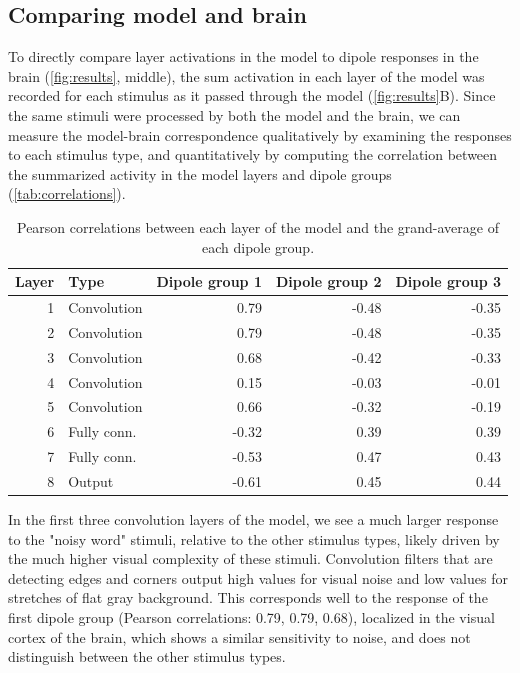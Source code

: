 \documentclass[a4paper, 10pt]{vanvliet_paper}
\begin{document}
\subsection{Comparing model and brain}

To directly compare layer activations in the model to dipole responses in the brain (\autoref{fig:results}, middle), the sum activation in each layer of the model was recorded for each stimulus as it passed through the model (\autoref{fig:results}B).
Since the same stimuli were processed by both the model and the brain, we can measure the model-brain correspondence qualitatively by examining the responses to each stimulus type, and quantitatively by computing the correlation between the summarized activity in the model layers and dipole groups (\autoref{tab:correlations}).

\begin{table}[b]
    \begin{tabular}{rlrrr}
        \toprule
        Layer & Type        & Dipole group 1 & Dipole group 2 & Dipole group 3 \\
        \midrule
            1 & Convolution &           0.79 &          -0.48 &          -0.35 \\
            2 & Convolution &           0.79 &          -0.48 &          -0.35 \\
            3 & Convolution &           0.68 &          -0.42 &          -0.33 \\
            4 & Convolution &           0.15 &          -0.03 &          -0.01 \\
            5 & Convolution &           0.66 &          -0.32 &          -0.19 \\
            6 & Fully conn. &          -0.32 &           0.39 &           0.39 \\
            7 & Fully conn. &          -0.53 &           0.47 &           0.43 \\
            8 & Output      &          -0.61 &           0.45 &           0.44 \\
        \bottomrule
    \end{tabular}
    \caption{Pearson correlations between each layer of the model and the grand-average of each dipole group.}\label{tab:correlations}
\end{table}

In the first three convolution layers of the model, we see a much larger response to the "noisy word" stimuli, relative to the other stimulus types, likely driven by the much higher visual complexity of these stimuli.
Convolution filters that are detecting edges and corners output high values for visual noise and low values for stretches of flat gray background.
This corresponds well to the response of the first dipole group (Pearson correlations: 0.79, 0.79, 0.68), localized in the visual cortex of the brain, which shows a similar sensitivity to noise, and does not distinguish between the other stimulus types.
\end{document}
